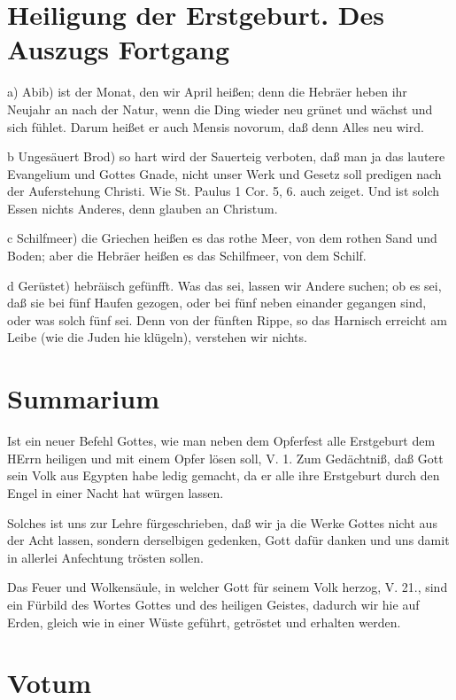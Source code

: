 \section{Heiligung der Erstgeburt. Des Auszugs Fortgang}

a) Abib) ist der Monat, den wir April heißen; denn die Hebräer heben ihr Neujahr an nach der Natur, wenn die Ding wieder neu grünet und wächst und sich fühlet. Darum heißet er auch Mensis novorum, daß denn Alles neu wird.

b Ungesäuert Brod) so hart wird der Sauerteig verboten, daß man ja das lautere Evangelium und Gottes Gnade, nicht unser Werk und Gesetz soll predigen nach der Auferstehung Christi. Wie St. Paulus 1 Cor. 5, 6. auch zeiget. Und ist solch Essen nichts Anderes, denn glauben an Christum.

c Schilfmeer) die Griechen heißen es das rothe Meer, von dem rothen Sand und Boden; aber die Hebräer heißen es das Schilfmeer, von dem Schilf.

d Gerüstet) hebräisch gefünfft. Was das sei, lassen wir Andere suchen; ob es sei, daß sie bei fünf Haufen gezogen, oder bei fünf neben einander gegangen sind, oder was solch fünf sei. Denn von der fünften Rippe, so das Harnisch erreicht am Leibe (wie die Juden hie klügeln), verstehen wir nichts.

\section{Summarium}

Ist ein neuer Befehl Gottes, wie man neben dem Opferfest alle Erstgeburt dem HErrn heiligen und mit einem Opfer lösen soll, V. 1. Zum Gedächtniß, daß Gott sein Volk aus Egypten habe ledig gemacht, da er alle ihre Erstgeburt durch den Engel in einer Nacht hat würgen lassen.

Solches ist uns zur Lehre fürgeschrieben, daß wir ja die Werke Gottes nicht aus der Acht lassen, sondern derselbigen gedenken, Gott dafür danken und uns damit in allerlei Anfechtung trösten sollen.

Das Feuer und Wolkensäule, in welcher Gott für seinem Volk herzog, V. 21., sind ein Fürbild des Wortes Gottes und des heiligen Geistes, dadurch wir hie auf Erden, gleich wie in einer Wüste geführt, getröstet und erhalten werden.

\section{Votum}

